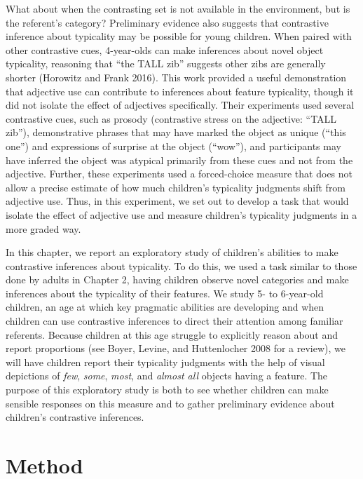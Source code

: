 \documentclass{ucetd}
\begin{document}
What about when the contrasting set is not available in the environment,
but is the referent's category? Preliminary evidence also suggests that
contrastive inference about typicality may be possible for young
children. When paired with other contrastive cues, 4-year-olds can make
inferences about novel object typicality, reasoning that ``the TALL
zib'' suggests other zibs are generally shorter (Horowitz and Frank
2016). This work provided a useful demonstration that adjective use can
contribute to inferences about feature typicality, though it did not
isolate the effect of adjectives specifically. Their experiments used
several contrastive cues, such as prosody (contrastive stress on the
adjective: ``TALL zib''), demonstrative phrases that may have marked the
object as unique (``this one'') and expressions of surprise at the
object (``wow''), and participants may have inferred the object was
atypical primarily from these cues and not from the adjective. Further,
these experiments used a forced-choice measure that does not allow a
precise estimate of how much children's typicality judgments shift from
adjective use. Thus, in this experiment, we set out to develop a task
that would isolate the effect of adjective use and measure children's
typicality judgments in a more graded way.

In this chapter, we report an exploratory study of children's abilities
to make contrastive inferences about typicality. To do this, we used a
task similar to those done by adults in Chapter 2, having children
observe novel categories and make inferences about the typicality of
their features. We study 5- to 6-year-old children, an age at which key
pragmatic abilities are developing and when children can use contrastive
inferences to direct their attention among familiar referents. Because
children at this age struggle to explicitly reason about and report
proportions (see Boyer, Levine, and Huttenlocher 2008 for a review), we
will have children report their typicality judgments with the help of
visual depictions of \emph{few}, \emph{some}, \emph{most}, and
\emph{almost all} objects having a feature. The purpose of this
exploratory study is both to see whether children can make sensible
responses on this measure and to gather preliminary evidence about
children's contrastive inferences.

\hypertarget{method-3}{%
\section{Method}\label{method-3}}
\end{document}
